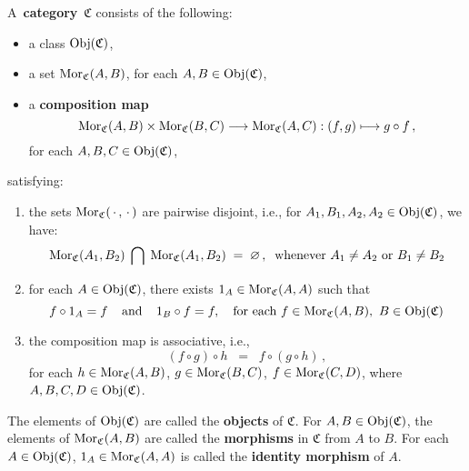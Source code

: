 \begin{definition}[Category]
\mbox{}
\vskip 0.15cm
\noindent
A \,\textbf{category}\, $\mathfrak{C}$ consists of the following:
\begin{itemize}
\item
	a class $\textnormal{Obj}(\mathfrak{C})$,
\item
	a set $\textnormal{Mor}_{\mathfrak{C}}(A,B)$, for each $A, B \in \textnormal{Obj}(\mathfrak{C})$,
\item
	a \textbf{composition map}
	\begin{equation*}
	\textnormal{Mor}_{\mathfrak{C}}(A,B) \times \textnormal{Mor}_{\mathfrak{C}}(B,C) \longrightarrow \textnormal{Mor}_{\mathfrak{C}}(A,C) : (f,g) \longmapsto g \circ f\,,
	\end{equation*}
	for each $A, B, C \in \textnormal{Obj}(\mathfrak{C})$,
\end{itemize}
satisfying:
\begin{enumerate}
\item
	the sets $\textnormal{Mor}_{\mathfrak{C}}(\,\cdot\,,\,\cdot\,)$ are pairwise disjoint, i.e.,
	for $A_{1}, B_{1}, A_{2}, A_{2} \in \textnormal{Obj}(\mathfrak{C})$, we have:
	\begin{equation*}
	\textnormal{Mor}_{\mathfrak{C}}(A_{1},B_{2})\;\bigcap\;\textnormal{Mor}_{\mathfrak{C}}(A_{1},B_{2})
	\; = \;
		\varnothing\,,
	\;\;
	\textnormal{whenever $A_{1} \neq A_{2}$ or $B_{1} \neq B_{2}$}
	\end{equation*}
\item
	for each $A \in \textnormal{Obj}(\mathfrak{C})$, there exists $1_{A} \in \textnormal{Mor}_{\mathfrak{C}}(A,A)$ such that
	\begin{equation*}
	f \circ 1_{A} = f
	\;\;\;\;\textnormal{and}\;\;\;\;
	1_{B} \circ f = f,
	\quad
	\textnormal{for each $f \in \textnormal{Mor}_{\mathfrak{C}}(A,B)$, \,$B \in \textnormal{Obj}(\mathfrak{C})$}
	\end{equation*}
\item
	the composition map is associative, i.e.,
	\begin{equation*}
	(f \circ g) \circ h
	\;\; = \;\;
	f \circ (g \circ h)\,,
	\end{equation*}
	for each
	$h \in \textnormal{Mor}_{\mathfrak{C}}(A,B)$,
	$g \in \textnormal{Mor}_{\mathfrak{C}}(B,C)$,
	$f \in \textnormal{Mor}_{\mathfrak{C}}(C,D)$,\;
	where
	\,$A,B,C,D \in \textnormal{Obj}(\mathfrak{C})$.
\end{enumerate}
The elements of $\textnormal{Obj}(\mathfrak{C})$ are called the \textbf{objects} of $\mathfrak{C}$.
For $A, B \in \textnormal{Obj}(\mathfrak{C})$, the elements of  $\textnormal{Mor}_{\mathfrak{C}}(A,B)$
are called the \textbf{morphisms} in $\mathfrak{C}$ from $A$ to $B$.
For each $A \in \textnormal{Obj}(\mathfrak{C})$, $1_{A} \in \textnormal{Mor}_{\mathfrak{C}}(A,A)$ is called
the \textbf{identity morphism} of $A$.
\end{definition}

